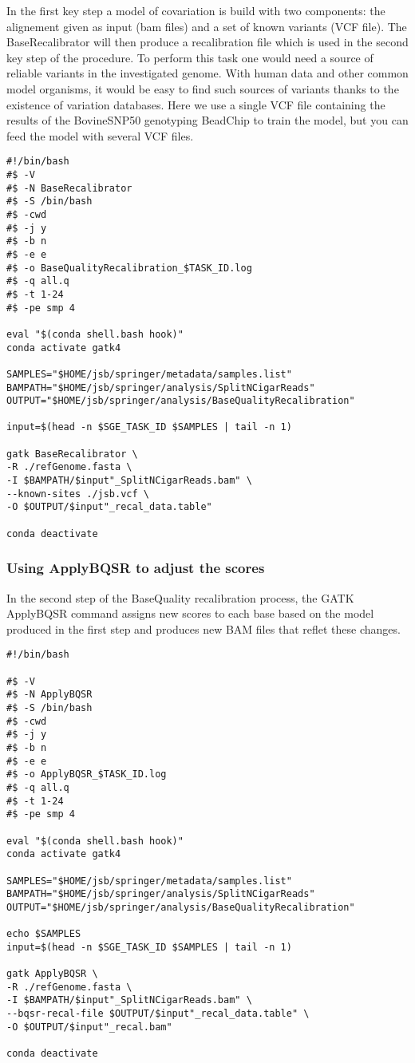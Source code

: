 In the first key step  a model of covariation is build with two components: the alignement given as input (bam files) and a set of known variants (VCF file). The BaseRecalibrator will then produce a recalibration file which is used in the second key step of the procedure. To perform this task one would need a source of reliable variants in the investigated genome. With human data and other common model organisms, it would be easy to find such sources of variants thanks to the existence of variation databases. Here we use a single VCF file containing the results of the BovineSNP50 genotyping BeadChip to train the model, but you can feed the model with several VCF files.

\begin{verbatim}
#!/bin/bash
#$ -V
#$ -N BaseRecalibrator
#$ -S /bin/bash
#$ -cwd
#$ -j y
#$ -b n
#$ -e e
#$ -o BaseQualityRecalibration_$TASK_ID.log
#$ -q all.q
#$ -t 1-24
#$ -pe smp 4

eval "$(conda shell.bash hook)"
conda activate gatk4

SAMPLES="$HOME/jsb/springer/metadata/samples.list"
BAMPATH="$HOME/jsb/springer/analysis/SplitNCigarReads"
OUTPUT="$HOME/jsb/springer/analysis/BaseQualityRecalibration"

input=$(head -n $SGE_TASK_ID $SAMPLES | tail -n 1)

gatk BaseRecalibrator \
-R ./refGenome.fasta \
-I $BAMPATH/$input"_SplitNCigarReads.bam" \
--known-sites ./jsb.vcf \
-O $OUTPUT/$input"_recal_data.table"

conda deactivate
\end{verbatim}





\subsubsection{Using ApplyBQSR to adjust the scores}

In the second step of the BaseQuality recalibration process, the GATK ApplyBQSR command assigns new scores to each base based on the model produced in the first step and produces new BAM files that reflet these changes.  


\begin{verbatim}
#!/bin/bash

#$ -V
#$ -N ApplyBQSR
#$ -S /bin/bash
#$ -cwd
#$ -j y
#$ -b n
#$ -e e
#$ -o ApplyBQSR_$TASK_ID.log
#$ -q all.q
#$ -t 1-24
#$ -pe smp 4

eval "$(conda shell.bash hook)"
conda activate gatk4

SAMPLES="$HOME/jsb/springer/metadata/samples.list"
BAMPATH="$HOME/jsb/springer/analysis/SplitNCigarReads"
OUTPUT="$HOME/jsb/springer/analysis/BaseQualityRecalibration"

echo $SAMPLES
input=$(head -n $SGE_TASK_ID $SAMPLES | tail -n 1)

gatk ApplyBQSR \
-R ./refGenome.fasta \
-I $BAMPATH/$input"_SplitNCigarReads.bam" \
--bqsr-recal-file $OUTPUT/$input"_recal_data.table" \
-O $OUTPUT/$input"_recal.bam"

conda deactivate
\end{verbatim}

